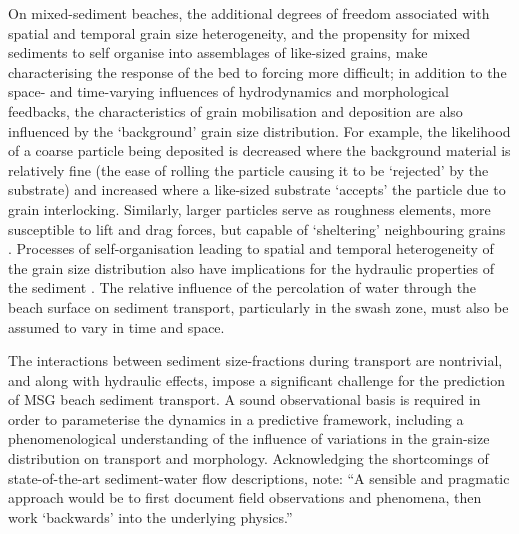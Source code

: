 On mixed-sediment beaches, the additional degrees of freedom associated with spatial and temporal grain size heterogeneity, and the propensity for mixed sediments to self organise into assemblages of like-sized grains, make characterising the response of the bed to forcing more difficult; in addition to the space- and time-varying influences of hydrodynamics and morphological feedbacks, the characteristics of grain mobilisation and deposition are also influenced by the `background' grain size distribution. For example, the likelihood of a coarse particle being deposited is decreased where the background material is relatively fine (the ease of rolling the particle causing it to be `rejected' by the substrate) and increased where a like-sized substrate `accepts' the particle due to grain interlocking. Similarly, larger particles serve as roughness elements, more susceptible to lift and drag forces, but capable of `sheltering' neighbouring grains \citep{Buscombe_Masselink2006}. Processes of self-organisation leading to spatial and temporal heterogeneity of the grain size distribution also have implications for the hydraulic properties of the sediment \citep[e.g.,][]{Horn2006}. The relative influence of the percolation of water through the beach surface on sediment transport, particularly in the swash zone, must also be assumed to vary in time and space.

The interactions between sediment size-fractions during transport are nontrivial, and along with hydraulic effects, impose a significant challenge for the prediction of MSG beach sediment transport. A sound observational basis is required in order to parameterise the dynamics in a predictive framework, including a phenomenological understanding of the influence of variations in the grain-size distribution on transport and morphology. Acknowledging the shortcomings of state-of-the-art sediment-water flow descriptions, \citet{Buscombe_Masselink2006} note: ``A sensible and pragmatic approach would be to first document field observations and phenomena, then work ‘backwards’ into the underlying physics.''


